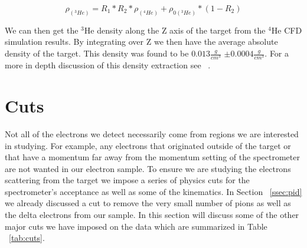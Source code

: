 \begin{equation} \label{eq:3he_density}
	\rho_{\left(^3He\right)} = R_1 * R_2 * \rho_{\left(^4He\right)} + \rho_{0\left(^3He\right)} * (1-R_2)
\end{equation}

\noindent We can then get the $^3$He density along the Z axis of the target from the $^4$He CFD simulation results. By integrating over Z we then have the average absolute density of the target. This density was found to be $0.013 \frac{g}{cm^3}$ $\pm 0.0004 \frac{g}{cm^3}$. For a more in depth discussion of this density extraction see ~\cite{density}.



\section{Cuts}
\label{sec:cuts}

Not all of the electrons we detect necessarily come from regions we are interested in studying. For example, any electrons that originated outside of the target or that have a momentum far away from the momentum setting of the spectrometer are not wanted in our electron sample. To ensure we are studying the electrons scattering from the target we impose a series of physics cuts for the spectrometer's acceptance as well as some of the kinematics. In Section ~\ref{ssec:pid} we already discussed a cut to remove the very small number of pions as well as the delta electrons from our sample. In this section will discuss some of the other major cuts we have imposed on the data which are summarized in Table ~\ref{tab:cuts}. 

